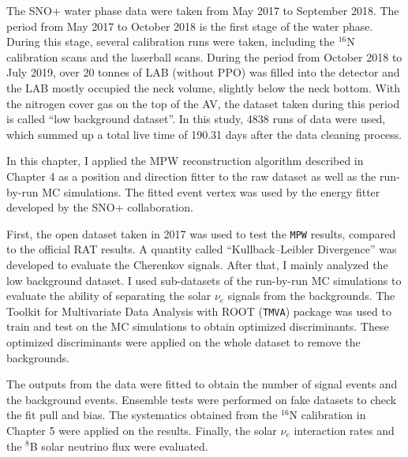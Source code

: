 
The SNO+ water phase data were taken from May 2017 to September 2018. The period from May 2017 to October 2018 is the first stage of the water phase. During this stage, several calibration runs were taken, including the $^{16}$N calibration scans and the laserball scans. During the period from October 2018 to July 2019, over 20 tonnes of LAB (without PPO) was filled into the detector and the LAB mostly occupied the neck volume, slightly below the neck bottom. With the nitrogen cover gas on the top of the AV, the dataset taken during this period is called ``low background dataset''. In this study, 4838 runs of data were used, which summed up a total live time of 190.31 days after the data cleaning process.
 
In this chapter, I applied the MPW reconstruction algorithm described in Chapter 4 as a position and direction fitter to the raw dataset as well as the run-by-run MC simulations. The fitted event vertex was used by the energy fitter developed by the SNO+ collaboration.  

First, the open dataset taken in 2017 was used to test the \texttt{MPW} results, compared to the official RAT results. A quantity called ``Kullback–Leibler Divergence'' was developed to evaluate the Cherenkov signals. After that, I mainly analyzed the low background dataset. I used sub-datasets of the run-by-run MC simulations to evaluate the ability of separating the solar $\nu_e$ signals from the backgrounds. The Toolkit for Multivariate Data Analysis with ROOT (\texttt{TMVA}) package\cite{tmvaWebsite,albertsson2007tmva} was used to train and test on the MC simulations to obtain optimized discriminants. These optimized discriminants were applied on the whole dataset to remove the backgrounds.

The outputs from the data were fitted to obtain the number of signal events and the background events. Ensemble tests were performed on fake datasets to check the fit pull and bias. The systematics obtained from the $^{16}$N calibration in Chapter 5 were applied on the results. Finally, the solar $\nu_e$ interaction rates and the $^8$B solar neutrino flux were evaluated.


